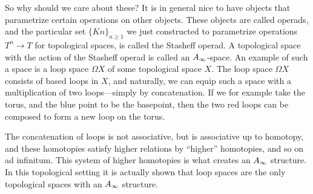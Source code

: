 \begin{remark}
So why should we care about these? It is in general nice to have objects that parametrize certain operations on other objects. These objects are called operads, and the particular set $\{Kn\}_{n\geq 1}$ we just constructed to parametrize operations $T^n\longrightarrow T$ for topological spaces, is called the Stasheff operad. A topological space with the action of the Stasheff operad is called an $A_{\infty}$-space. An example of such a space is a loop space $\Omega X$ of some topological space $X$. The loop space $\Omega X$ consists of based loops in $X$, and naturally, we can equip such a space with a multiplication of two loops---simply by concatenation. If we for example take the torus, and the blue point to be the basepoint, then the two red loops can be composed to form a new loop on the torus.

\begin{center}
\def\svgwidth{0.6\textwidth}

\end{center}

The concatenation of loops is not associative, but is associative up to homotopy, and these homotopies satisfy higher relations by ``higher'' homotopies, and so on ad infinitum. This system of higher homotopies is what creates an $A_{\infty}$ structure. In this topological setting it is actually shown that loop spaces are the only topological spaces with an $A_{\infty}$ structure. 
\end{remark}
